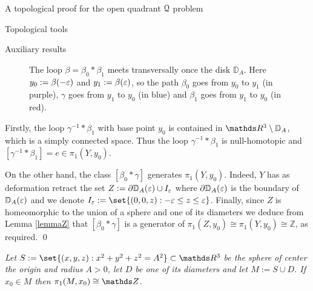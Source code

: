 \documentclass[11pt, a4paper, english, twoside, notitlepage, openright]{report}
\begin{document}
\begin{chapter}{A topological proof for the open quadrant $\mathcal{Q}$ problem}
\begin{section}{Topological tools}
\begin{subsection}{Auxiliary results}
\begin{lemma}
\begin{Proof}
\begin{figure}[ht!]
\begin{center}
\caption{The loop $\beta=\beta_0\ast\beta_1$ meets transversally once the disk ${\mathbb D}_A$. Here $y_0:=\beta(-\varepsilon)$ and $y_1:=\beta(\varepsilon)$, so the path $\beta_0$ goes from $y_0$ to $y_1$ (in purple), $\gamma$ goes from $y_1$ to $y_0$ (in blue) and $\beta_1$ goes from $y_1$ to $y_0$ (in red).}\label{fig:disc}
\end{center}
\end{figure}
Firstly, the loop $\gamma^{-1}\ast\beta_1$ with base point $y_0$ is contained in $\R^3\setminus{\mathbb D}_A$, which is a simply connected space. Thus the loop $\gamma^{-1}*\beta_1$ is null-homotopic and $[\gamma^{-1}*\beta_1]=e \in \pi_1(Y,y_0)$.

\vspace{1mm}

On the other hand, the class $[\beta_0\ast\gamma]$ generates $\pi_1(Y,y_0)$. Indeed, $Y$ has as deformation retract the set $Z:=\partial{\mathbb D}_A(\varepsilon)\cup I_\varepsilon$ where $\partial{\mathbb D}_A(\varepsilon)$ is the boundary of ${\mathbb D}_A(\varepsilon)$ and we denote $I_\eps:=\set{(0,0,z):-\eps\le z\le\eps}$. Finally, since $Z$ is homeomorphic to the union of a sphere and one of its diameters we deduce from Lemma \ref{lemmaZ} that $[\beta_0\ast\gamma]$ is a generator of $\pi_1(Z,y_0)\cong\pi_1(Y,y_0)\cong{\mathbb Z}$, as required.
\qed 
\end{Proof}
\end{lemma}

\vspace{1mm}

\begin{lemma}\label{lemmaZ} \em Let $S:=\set{(x,y,z):x^2+y^2+z^2=A^2}\subset\R^3$ be the sphere of center the origin and radius $A> 0$, let $D$ be one of its diameters and let $M := S\cup D$. If $x_0\in M$ then $\pi_1(M,x_0)\cong\Z$. \em 


\end{lemma}
\end{subsection}
\end{section}
\end{chapter}
\end{document}

